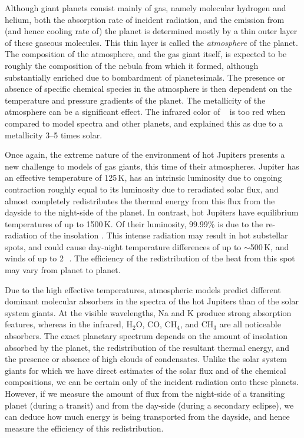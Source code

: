 Although giant planets consist mainly of gas, namely molecular hydrogen and helium, both the absorption rate of incident radiation, and the emission from (and hence cooling rate of) the planet is determined mostly by a thin outer layer of these gaseous molecules.
This thin layer is called the {\it atmosphere} of the planet.
The composition of the atmosphere, and the gas giant itself, is expected to be roughly the composition of the nebula from which it formed, although substantially enriched due to bombardment of planetesimals.
The presence or absence of specific chemical species in the atmosphere is then dependent on the temperature and pressure gradients of the planet.
The metallicity of the atmosphere can be a significant effect.
The infrared color of \tresOne~\citep{Charbonneau_Allen_Megeath:apj:2005a} is too red when compared to model spectra and other planets, and \citet{Fortney_Marley_Lodders:apjl:2005a} explained this as due to a metallicity 3--5 times solar.

Once again, the extreme nature of the environment of hot Jupiters presents a new challenge to models of gas giants, this time of their atmospheres.
Jupiter has an effective temperature of 125\,K, has an intrinsic luminosity due to ongoing contraction roughly equal to its luminosity due to reradiated solar flux, and almost completely redistributes the thermal energy from this flux from the dayside to the night-side of the planet.
In contrast, hot Jupiters have equilibrium temperatures of up to 1500\,K.
Of their luminosity, 99.99\% is due to the re-radiation of the insolation \citep{Marley_Fortney_Seager:PPV:2007a}.
This intense radiation may result in hot substellar spots, and could cause day-night temperature differences of up to $\sim$500\,K, and winds of up to 2\,\kms~\citep{Showman_Guillot:aa:2002a}.
The efficiency of the redistribution of the heat from this spot may vary from planet to planet.

Due to the high effective temperatures, atmospheric models predict different dominant molecular absorbers in the spectra of the hot Jupiters than of the solar system giants.
At the visible wavelengths, Na and K produce strong absorption features, whereas in the infrared, H$_2$O, CO, CH$_4$, and CH$_3$ are all noticeable absorbers.
The exact planetary spectrum depends on the amount of insolation absorbed by the planet, the redistribution of the resultant thermal energy, and the presence or absence of high clouds of condensates.
Unlike the solar system giants for which we have direct estimates of the solar flux and of the chemical compositions, we can be certain only of the incident radiation onto these planets.
However, if we measure the amount of flux from the night-side of a transiting planet (during a transit) and from the day-side (during a secondary eclipse), we can deduce how much energy is being transported from the dayside, and hence measure the efficiency of this redistribution.

